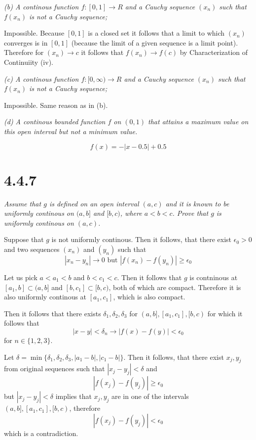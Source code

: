 \documentclass[11pt,oneside,titlepage]{book}
\begin{document}
\textit{(b) A continous function $f: [0, 1] \to R$ and a Cauchy sequence
  $(x_n)$ such that $f(x_n)$ is not a Cauchy sequence;}

Impossible. Because $[0, 1]$ is a closed set it follows that a limit
to which $(x_n)$ converges  is in $[0, 1]$ (because the limit of a given
sequence is a limit point). Therefore for 
$(x_n) \to c$ it follows that $f(x_n) \to f(c)$ by Characterization of
Continuiity (iv).

\textit{(c) A continous function $f: [0, \infty) \to R$ and a Cauchy sequence
  $(x_n)$ such that $f(x_n)$ is not a Cauchy sequence;}

Impossible. Same reason as in (b).

\textit{(d) A continous bounded function $f$ on $(0, 1)$ that attains a
  maximum value on this open interval but not a minimum value.}

$$f(x) = -|x - 0.5| + 0.5$$

\section*{4.4.7}
\textit{Assume that $g$ is defined on an open interval $(a, c)$ and it is
  known to be uniformly continous on $(a, b]$ and $[b, c)$, where
  $a < b < c$. Prove that $g$ is uniformly continous on $(a, c)$.}

Suppose that $g$ is not uniformly continous. Then it follows, that
there exist $\epsilon_0 > 0$ and
two sequences $(x_n)$ and $(y_n)$ such that
$$|x_n - y_n| \to 0 \text{ but } |f(x_n) - f(y_n)| \geq \epsilon_0$$

Let us pick $a < a_1 < b$ and $b < c_1 < c$. Then it follows that
$g$ is contninous at $[a_1, b] \subset (a, b] $ and $[b, c_1] \subset [b, c)$,
both of which are compact. Therefore it is also uniformly continous at
$[a_1, c_1]$, which is also compact.

Then it follows that there exists $\delta_1, \delta_2, \delta_3$ for
$(a, b], [a_1, c_1], [b, c)$ for which it follows that
$$|x - y| < \delta_n \to |f(x) - f(y)| < \epsilon_0$$
for $n \in \{1, 2, 3\}$.

Let $\delta = \min\{\delta_1, \delta_2, \delta_3, |a_1 - b|, |c_1 - b|\}$.
Then it follows, that there exist $x_j, y_j$ from original sequences
such that $|x_j - y_j| < \delta$ and 
$$|f(x_j) - f(y_j)| \geq \epsilon_0$$
but $|x_j - y_j| < \delta$ implies that $x_j, y_j$ are in one of the
intervals $(a, b], [a_1, c_1], [b, c)$, therefore 
$$|f(x_j) - f(y_j)| < \epsilon_0$$
which is a contradiction.
\end{document}
